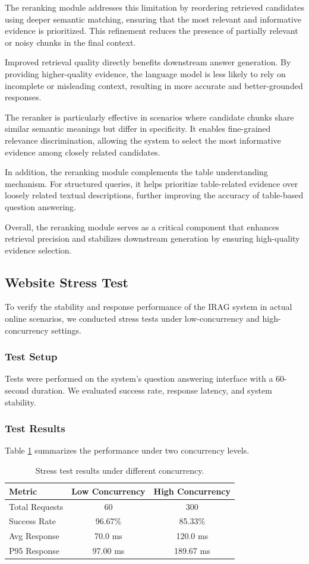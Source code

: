 \documentclass[10pt,conference]{IEEEtran}
\begin{document}
The reranking module addresses this limitation by reordering retrieved candidates using deeper semantic matching, ensuring that the most relevant and informative evidence is prioritized. This refinement reduces the presence of partially relevant or noisy chunks in the final context.

Improved retrieval quality directly benefits downstream answer generation. By providing higher-quality evidence, the language model is less likely to rely on incomplete or misleading context, resulting in more accurate and better-grounded responses.

The reranker is particularly effective in scenarios where candidate chunks share similar semantic meanings but differ in specificity. It enables fine-grained relevance discrimination, allowing the system to select the most informative evidence among closely related candidates.

In addition, the reranking module complements the table understanding mechanism. For structured queries, it helps prioritize table-related evidence over loosely related textual descriptions, further improving the accuracy of table-based question answering.

Overall, the reranking module serves as a critical component that enhances retrieval precision and stabilizes downstream generation by ensuring high-quality evidence selection.
\subsection{Website Stress Test}
To verify the stability and response performance of the IRAG system in actual online scenarios, we conducted stress tests under low-concurrency and high-concurrency settings.

\subsubsection{Test Setup}
Tests were performed on the system's question answering interface with a 60-second duration. We evaluated success rate, response latency, and system stability.

\subsubsection{Test Results}
Table \ref{tab:stress} summarizes the performance under two concurrency levels.
\begin{table}[htbp]
    \centering
    \caption{Stress test results under different concurrency.}
    \label{tab:stress}
    \begin{tabular}{lcc}
        \toprule
        Metric & Low Concurrency & High Concurrency \\
        \midrule
        Total Requests & 60 & 300 \\
        Success Rate & 96.67\% & 85.33\% \\
        Avg Response & 70.0 ms & 120.0 ms \\
        P95 Response & 97.00 ms & 189.67 ms \\
        \bottomrule
    \end{tabular}
\end{table}
\end{document}
